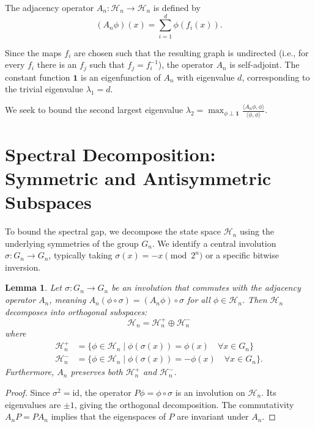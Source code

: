 \documentclass[11pt, a4paper]{article}
\newtheorem{lemma}[theorem]{Lemma}
\theoremstyle{definition}
\begin{document}
The adjacency operator $A_n : \mathcal{H}_n \to \mathcal{H}_n$ is defined by
\begin{equation}
    (A_n \phi)(x) = \sum_{i=1}^d \phi(f_i(x)).
\end{equation}

Since the maps $f_i$ are chosen such that the resulting graph is undirected (i.e., for every $f_i$ there is an $f_j$ such that $f_j = f_i^{-1}$), the operator $A_n$ is self-adjoint. The constant function $\mathbf{1}$ is an eigenfunction of $A_n$ with eigenvalue $d$, corresponding to the trivial eigenvalue $\lambda_1 = d$.

We seek to bound the second largest eigenvalue $\lambda_2 = \max_{\phi \perp \mathbf{1}} \frac{\langle A_n \phi, \phi \rangle}{\langle \phi, \phi \rangle}$.

\section{Spectral Decomposition: Symmetric and Antisymmetric Subspaces}

To bound the spectral gap, we decompose the state space $\mathcal{H}_n$ using the underlying symmetries of the group $G_n$. We identify a central involution $\sigma : G_n \to G_n$, typically taking $\sigma(x) = -x \pmod{2^n}$ or a specific bitwise inversion. 

\begin{lemma}
Let $\sigma : G_n \to G_n$ be an involution that commutes with the adjacency operator $A_n$, meaning $A_n(\phi \circ \sigma) = (A_n \phi) \circ \sigma$ for all $\phi \in \mathcal{H}_n$. Then $\mathcal{H}_n$ decomposes into orthogonal subspaces:
\begin{equation}
    \mathcal{H}_n = \mathcal{H}_n^+ \oplus \mathcal{H}_n^-
\end{equation}
where
\begin{align*}
    \mathcal{H}_n^+ &= \{ \phi \in \mathcal{H}_n \mid \phi(\sigma(x)) = \phi(x) \quad \forall x \in G_n \} \\
    \mathcal{H}_n^- &= \{ \phi \in \mathcal{H}_n \mid \phi(\sigma(x)) = -\phi(x) \quad \forall x \in G_n \}.
\end{align*}
Furthermore, $A_n$ preserves both $\mathcal{H}_n^+$ and $\mathcal{H}_n^-$.
\end{lemma}

\begin{proof}
Since $\sigma^2 = \mathrm{id}$, the operator $P \phi = \phi \circ \sigma$ is an involution on $\mathcal{H}_n$. Its eigenvalues are $\pm 1$, giving the orthogonal decomposition. The commutativity $A_n P = P A_n$ implies that the eigenspaces of $P$ are invariant under $A_n$.
\end{proof}
\end{document}
